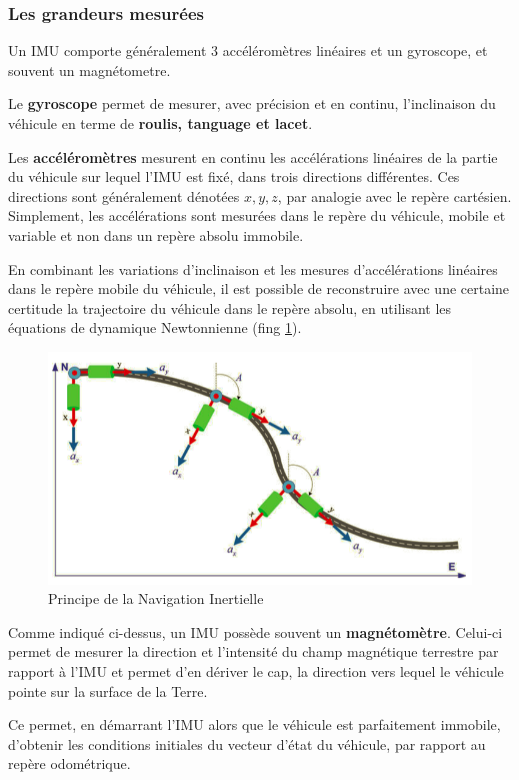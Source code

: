 \documentclass[12pt,a4paper]{report}
\begin{document}
		\subsubsection{Les grandeurs mesurées}
		Un IMU comporte généralement 3 accéléromètres linéaires et un gyroscope, et souvent un magnétometre.
		
		\para Le \textbf{gyroscope} permet de mesurer, avec précision et en continu, l'inclinaison du véhicule en terme de \textbf{roulis, tanguage et lacet}. 
		
		\para Les \textbf{accéléromètres} mesurent en continu les accélérations linéaires de la partie du véhicule sur lequel l'IMU est fixé, dans trois directions différentes. Ces directions sont généralement dénotées $x,y,z$, par analogie avec le repère cartésien. Simplement, les accélérations sont mesurées dans le repère du véhicule, mobile et variable et non dans un repère absolu immobile.
		
		\para En combinant les variations d'inclinaison et les mesures d'accélérations linéaires dans le repère mobile du véhicule, il est possible de reconstruire avec une certaine certitude la trajectoire du véhicule dans le repère absolu, en utilisant les équations de dynamique Newtonnienne (fing \ref{fig:navinertial}).
		
		\begin{figure}[h!]
			\centering
			\includegraphics[width=0.7\linewidth]{img/navinertial}
			\caption[Navigation Inertielle]{Principe de la Navigation Inertielle}
			\label{fig:navinertial}
		\end{figure}
		
		
		\para Comme indiqué ci-dessus, un IMU possède souvent un \textbf{magnétomètre}. Celui-ci permet de mesurer la direction et l'intensité du champ magnétique terrestre par rapport à l'IMU et permet d'en dériver le cap, la direction vers lequel le véhicule pointe sur la surface de la Terre. 
		
		\para Ce permet, en démarrant l'IMU alors que le véhicule est parfaitement immobile, d'obtenir les conditions initiales du vecteur d'état du véhicule, par rapport au repère odométrique.
		
\end{document}
